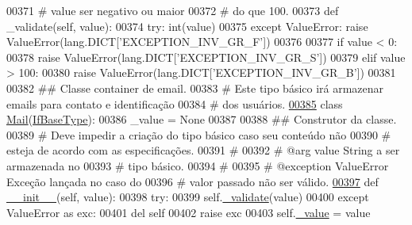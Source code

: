 \begin{DoxyCode}
00371     \textcolor{comment}{#                           value ser negativo ou maior}
00372     \textcolor{comment}{#                           do que 100.}
00373     \textcolor{keyword}{def }\_validate(self, value):
00374         \textcolor{keywordflow}{try}: int(value)
00375         \textcolor{keywordflow}{except} ValueError: \textcolor{keywordflow}{raise} ValueError(lang.DICT[\textcolor{stringliteral}{'EXCEPTION\_INV\_GR\_F'}])
00376 
00377         \textcolor{keywordflow}{if} value < 0:
00378             \textcolor{keywordflow}{raise} ValueError(lang.DICT[\textcolor{stringliteral}{'EXCEPTION\_INV\_GR\_S'}])
00379         \textcolor{keywordflow}{elif} value > 100:
00380             \textcolor{keywordflow}{raise} ValueError(lang.DICT[\textcolor{stringliteral}{'EXCEPTION\_INV\_GR\_B'}])
00381 
00382 \textcolor{comment}{## Classe container de email.}
00383 \textcolor{comment}{#   Este tipo básico irá armazenar emails para contato e identificação}
00384 \textcolor{comment}{#   dos usuários.}
\hypertarget{BaseUnit_8py_source_l00385}{}\hyperlink{classELO_1_1BaseUnit_1_1Mail}{00385} \textcolor{keyword}{class }\hyperlink{classELO_1_1BaseUnit_1_1Mail}{Mail}(\hyperlink{classELO_1_1BaseUnit_1_1IfBaseType}{IfBaseType}):
00386     \_value = \textcolor{keywordtype}{None}
00387 
00388     \textcolor{comment}{## Construtor da classe.}
00389     \textcolor{comment}{#   Deve impedir a criação do tipo básico caso seu conteúdo não}
00390     \textcolor{comment}{#   esteja de acordo com as especificações.}
00391     \textcolor{comment}{#}
00392     \textcolor{comment}{#   @arg        value       String a ser armazenada no}
00393     \textcolor{comment}{#                           tipo básico.}
00394     \textcolor{comment}{#}
00395     \textcolor{comment}{#   @exception  ValueError  Exceção lançada no caso do}
00396     \textcolor{comment}{#                           valor passado não ser válido.}
\hypertarget{BaseUnit_8py_source_l00397}{}\hyperlink{classELO_1_1BaseUnit_1_1Mail_a1a03bcc4d4ad5612c96614308b582fc0}{00397}     \textcolor{keyword}{def }\hyperlink{classELO_1_1BaseUnit_1_1Mail_a1a03bcc4d4ad5612c96614308b582fc0}{\_\_init\_\_}(self, value):
00398         \textcolor{keywordflow}{try}:
00399             self.\hyperlink{classELO_1_1BaseUnit_1_1IfBaseType_acf84c5906a39b605a23ab68c4ca1dd19}{\_validate}(value)
00400         \textcolor{keywordflow}{except} ValueError \textcolor{keyword}{as} exc:
00401             del self
00402             \textcolor{keywordflow}{raise} exc
00403         self.\hyperlink{classELO_1_1BaseUnit_1_1IfBaseType_ad05d9d377fc4b99743c022cc8f6019d7}{\_value} = value

\end{DoxyCode}

